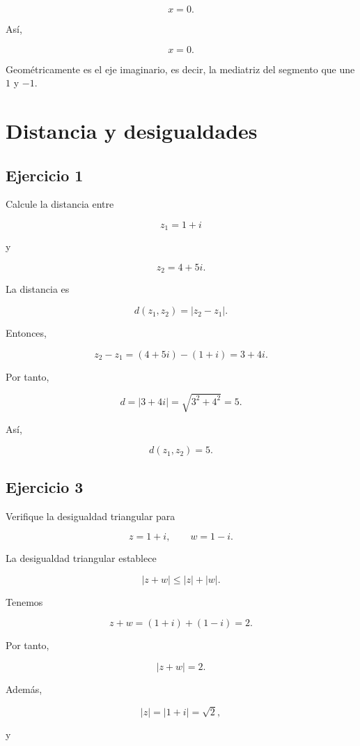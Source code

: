 \documentclass[12pt]{article}
\begin{document}
\[
x=0.
\]

Así,

\[
\boxed{x=0}.
\]

Geométricamente es el eje imaginario, es decir, la mediatriz del
segmento que une \(1\) y \(-1\).

\section*{Distancia y desigualdades}

\subsection*{Ejercicio 1}

Calcule la distancia entre

\[
z_1=1+i
\]

y

\[
z_2=4+5i.
\]

La distancia es

\[
d(z_1,z_2)=|z_2-z_1|.
\]

Entonces,

\[
z_2-z_1
=
(4+5i)-(1+i)
=
3+4i.
\]

Por tanto,

\[
d
=
|3+4i|
=
\sqrt{3^2+4^2}
=
5.
\]

Así,

\[
\boxed{d(z_1,z_2)=5}.
\]


\subsection*{Ejercicio 3}

Verifique la desigualdad triangular para

\[
z=1+i,
\qquad
w=1-i.
\]

La desigualdad triangular establece

\[
|z+w|
\leq
|z|+|w|.
\]

Tenemos

\[
z+w
=
(1+i)+(1-i)
=
2.
\]

Por tanto,

\[
|z+w|=2.
\]

Además,

\[
|z|
=
|1+i|
=
\sqrt2,
\]

y
\end{document}
